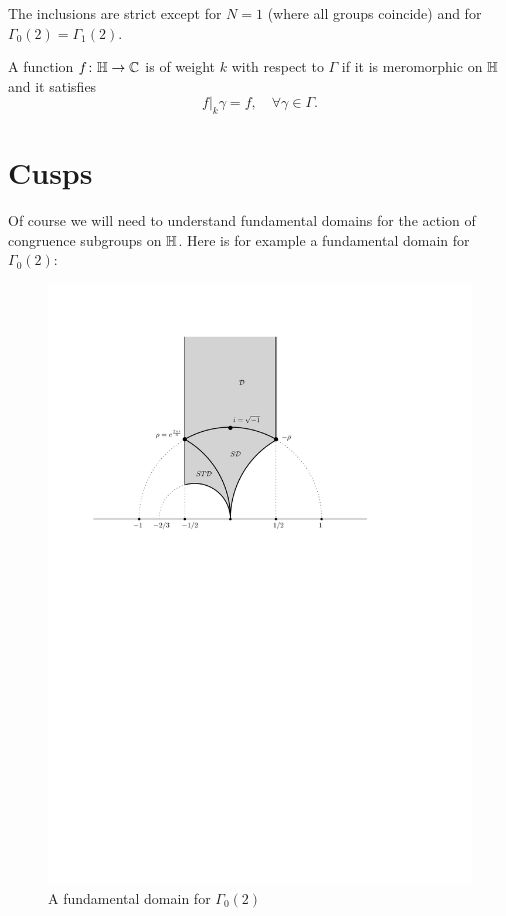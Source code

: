 \begin{remark}
  The inclusions are strict except for $N=1$ (where all groups coincide) and for $\Gamma_0(2)=\Gamma_1(2)$.
\end{remark}

\begin{definition}
  A function $f\colon\mathbb{H}\to\mathbb{C}$ is  of weight $k$ with respect to $\Gamma$ if it is meromorphic on $\mathbb{H}$ and it satisfies
\[
f|_k\gamma = f,\quad \forall \gamma\in\Gamma.
\]
\end{definition}
\newcommand{\Cusps}{\operatorname{Cusps}}
\section{Cusps}
\label{sec:cusps}

Of course we will need to understand fundamental domains for the action of congruence subgroups on $\mathbb{H}$. Here is for example a fundamental domain for $\Gamma_0(2)$:
\begin{figure}[h]
  \centering
  \includegraphics{fundomGamma02.pdf}
  \caption{A fundamental domain for $\Gamma_0(2)$}
  \label{fig:fundom-gamma02}
\end{figure}

